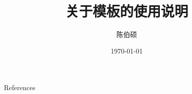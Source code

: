 \documentclass[slide]{myslide} %
\title{关于模板的使用说明}
\date{\today}
\author{陈伯硕}
\institute{github}
\begin{document}
\begin{frame}
	\maketitle
\end{frame}




	\begin{frame}[allowframebreaks]{References}
		\nocite{*}
		\printbibliography
	\end{frame}
\end{document}

